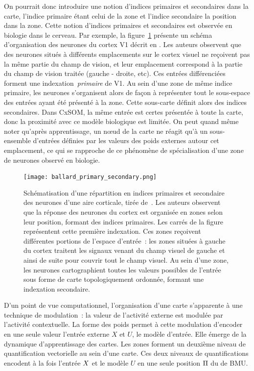 \documentclass[../main]{subfiles}
\begin{document}
On pourrait donc introduire une notion d'indices primaires et secondaires dans la carte, l'indice primaire étant celui de la zone et l'indice secondaire la position dans la zone.
Cette notion d'indices primaires et secondaires est observée en biologie dans le cerveau. 
Par exemple, la figure~\ref{fig:ballard} présente un schéma d'organisation des neurones du cortex V1 décrit en \cite{ballard_cortical_1986}.
Les auteurs observent que des neurones situés à différents emplacements sur le cortex visuel ne reçoivent pas la même partie du champ de vision, et leur emplacement correspond à la partie du champ de vision traitée (gauche - droite, etc).
Ces entrées différenciées forment une indexation~\emph{primaire} de V1. 
Au sein d'une zone de même indice primaire, les neurones s'organisent alors de façon à représenter tout le sous-espace des entrées ayant été présenté à la zone. Cette sous-carte définit alors des indices secondaires.
Dans CxSOM, la même entrée est certes présentée à toute la carte, donc la proximité avec ce modèle biologique est limitée. On peut quand même noter qu'après apprentissage, un n\oe{}ud de la carte ne réagit qu'à un sous-ensemble d'entrées définies par les valeurs des poids externes autour cet emplacement, ce qui se rapproche de ce phénomène de spécialisation d'une zone de neurones observé en biologie.

\begin{figure}[H]
	\centering\texttt{[image: ballard\_primary\_secondary.png]}
	\vspace{-0.5cm}
	\caption{Schématisation d'une répartition en indices primaires et secondaire des neurones d'une aire corticale, tirée de~\cite{ballard_cortical_1986}. 
	Les auteurs observent que la réponse des neurones du cortex est organisée en zones selon leur position, formant des indices primaires. Les carrés de la figure représentent cette première indexation.
	Ces zones reçoivent différentes portions de l'espace d'entrée~: les zones situées à gauche du cortex traitent les signaux venant du champ visuel de gauche et ainsi de suite pour couvrir tout le champ visuel.
	Au sein d'une zone, les neurones cartographient toutes les valeurs possibles de l'entrée sous forme de carte topologiquement ordonnée, formant une indexation secondaire. \label{fig:ballard}}
\end{figure}

D'un point de vue computationnel, l'organisation d'une carte s'apparente à une technique de modulation~: la valeur de l'activité externe est modulée par l'activité contextuelle. 
La forme des poids permet à cette modulation d'encoder en une seule valeur l'entrée externe $X$ et $U$, le modèle d'entrée. Elle émerge de la dynamique d'apprentissage des cartes.
Les zones forment un deuxième niveau de quantification vectorielle au sein d'une carte. 
Ces deux niveaux de quantifications encodent à la fois l'entrée $X$ et le modèle $U$ en une seule position $\Pi$ du de BMU.
\end{document}
